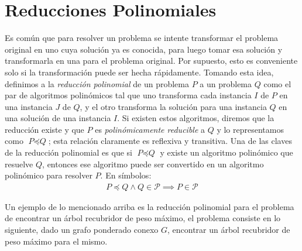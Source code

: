 \documentclass{article}
\begin{document}
\noindent{}

\section*{Reducciones Polinomiales}
\indent Es común que para resolver un problema se intente transformar
el problema original en uno cuya solución ya es conocida, para luego
tomar esa solución y transformarla en una para el problema original.
Por supuesto, esto es conveniente solo si la transformación puede
ser hecha rápidamente. Tomando esta idea, definimos a la
\textit{reducción polinomial} de un problema $P$ a un problema $Q$ como el par de algoritmos polinómicos tal que uno transforma cada instancia $I$ de $P$ en una instancia $J$ de $Q$, y el otro transforma la solución para una instancia $Q$ en una solución de una instancia $I$. Si existen estos algoritmos, diremos que la reducción existe y que $P$ es \textit{polinómicamente reducible} a $Q$ y lo representamos como $\textit{P} \preceq \textit{Q}$; esta relación claramente es reflexiva y transitiva.\newline
\indent Una de las claves de la reducción polinomial es que si $\textit{P} \preceq \textit{Q}$ y existe un algoritmo polinómico que resuelve $Q$, entonces ese algoritmo puede ser convertido en un algoritmo polinómico para resolver $P$. En símbolos:
\begin{align*}
    P \preceq Q \land Q \in \mathcal{P} \implies P \in \mathcal{P}
\end{align*}

Un ejemplo de lo mencionado arriba es la reducción polinomial para el
problema de encontrar un árbol recubridor de peso máximo, el problema
consiste en lo siguiente, dado un grafo ponderado conexo $G$, encontrar
un árbol recubridor de peso máximo para el mismo.
\end{document}
